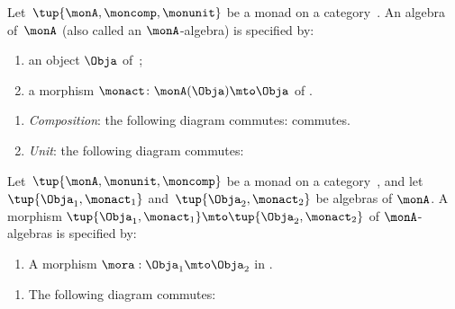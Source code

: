 \begin{ctdefinition}
    \label{def:algebramon}
    Let~$\tup{\monA, \moncomp, \monunit}$ be a monad on a category~\CatC.
    An algebra of~$\monA$ (also called an $\monA$-algebra) is specified by: \

    \constit
    \begin{enumerate}
        \item an object $\Obja$ of~\CatC;
        \item a morphism $\monact\colon \monA(\Obja) \mto \Obja$ of \CatC.
    \end{enumerate}
    \condit
    \begin{enumerate}
        \item \emph{Composition}: the following diagram commutes:
              commutes.
        \item \emph{Unit}: the following diagram commutes:

    \end{enumerate}
\end{ctdefinition}



\begin{ctdefinition}
    \label{def:algebramorphism}
    Let~$\tup{\monA, \monunit, \moncomp}$ be a monad on a category~\CatC, and let~$\tup{\Obja_1, \monact_1}$ and~$\tup{\Obja_2, \monact_2}$ be algebras of $\monA$.
    A morphism $\tup{\Obja_1, \monact_1} \mto \tup{\Obja_2, \monact_2}$ of $\monA$-algebras is specified by: \

    \constit
    \begin{enumerate}
        \item A morphism $\mora : \Obja_1 \mto \Obja_2$ in \CatC.
    \end{enumerate}
    \condit
    \begin{enumerate}
        \item The following diagram commutes:

    \end{enumerate}
\end{ctdefinition}

